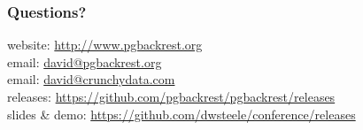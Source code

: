 \begin{frame}
    \frametitle{Questions?}

    website: \url{http://www.pgbackrest.org}\\
    \vspace{1em}
    email: \href{mailto:david@pgbackrest.org}{david@pgbackrest.org} \\
    email: \href{mailto:david@crunchydata.com}{david@crunchydata.com}\\
    \vspace{1em}
    releases: \url{https://github.com/pgbackrest/pgbackrest/releases}\\
    \vspace{1em}
    slides \& demo: \url{https://github.com/dwsteele/conference/releases}\\
\end{frame}


